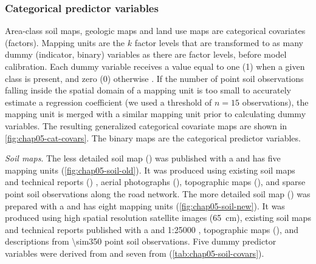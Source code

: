 \subsubsection{Categorical predictor variables}
\label{subsubsec:chap05-categorical-covars}

Area-class soil maps, geologic maps and land use maps are categorical covariates (factors). Mapping units are 
the $k$ factor levels that are transformed to as many dummy (indicator, binary) variables as there are factor 
levels, before model calibration. Each dummy variable receives a value equal to one (\num{1}) when a given 
class is present, and zero (\num{0}) otherwise \cite{Everitt2006}. If the number of point soil observations 
falling inside the spatial domain of a mapping unit is too small to accurately estimate a regression 
coefficient (we used a threshold of $n = 15$ observations), the mapping unit is merged with a similar mapping 
unit prior to calculating dummy variables. The resulting generalized categorical covariate maps are shown in 
\autoref{fig:chap05-cat-covars}. The binary maps are the categorical predictor variables.

\noindent\textit{Soil maps}. The less detailed soil map (\soilOld) was published with a  and 
has five mapping units \cite{AzolinEtAl1988} (\autoref{fig:chap05-soil-old}). It was produced using existing 
soil maps and technical reports () \cite{Brasil1973}, aerial photographs (), 
topographic maps (), and sparse point soil observations along the road network. The more detailed 
soil map (\soilNew) was prepared with a  and has eight mapping units \cite{MiguelEtAl2012} 
(\autoref{fig:chap05-soil-new}). It was produced using high spatial resolution satellite images 
(\SI{65}{\cm}), existing soil maps and technical reports published with a  \cite{Poelking2007} 
and \num{1}:\num{25000} \cite{PedronEtAl2006b}, topographic maps (), and descriptions from 
\num{\sim350} point soil observations. Five dummy predictor variables were derived from \soilOld{} and seven 
from \soilNew{} (\autoref{tab:chap05-soil-covars}).

